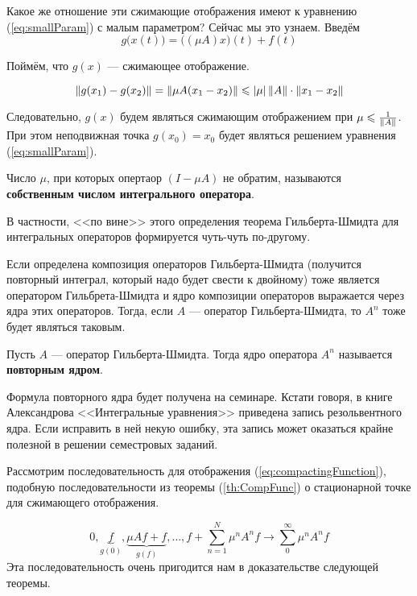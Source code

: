 \documentclass[12pt]{article}
\begin{document}
	Какое же отношение эти сжимающие отображения имеют к уравнению (\ref{eq:smallParam}) с малым параметром? 
	Сейчас мы это узнаем. Введём 
	\begin{equation}
		g\big(x(t)\big) = \big((\mu A)x\big)(t) + f(t) \label{eq:compactingFunction}
	\end{equation}
	
	Поймём, что $g(x)$ --- сжимающее отображение.
	
	$$\left\| g(x_1) - g(x_2) \right\| = \left\| \mu A(x_1 - x_2) \right\| \leqslant \left| \mu \right| \left\| A \right\| \cdot \left\| x_1 - x_2 \right\|$$
	
	Следовательно, $g(x)$ будем являться сжимающим отображением при $\mu \leqslant \frac{1}{\left\| A \right\|}$. При этом
	неподвижная точка $g(x_0) = x_0$ будет являться решением уравнения (\ref{eq:smallParam}).
	
	\begin{defi}
		Число $\mu$, при которых опертаор $(I - \mu A)$ не обратим, называются \textbf{собственным числом
		интегрального оператора}.
	\end{defi}
	
	В частности, <<по вине>> этого определения теорема Гильберта-Шмидта для интегральных операторов формируется
	чуть-чуть по-другому.
	
	Если определена композиция операторов Гильберта-Шмидта (получится повторный интеграл, который надо будет 
	свести к двойному) тоже является оператором Гильбрета-Шмидта и ядро композиции операторов выражается 
	через ядра этих операторов. Тогда, если $A$ --- оператор Гильберта-Шмидта, то $A^n$ тоже будет являться
	таковым.
	
	\begin{defi}
		Пусть $A$ --- оператор Гильберта-Шмидта. Тогда ядро оператора $A^n$ называется \textbf{повторным ядром}.
	\end{defi}
	
	{\footnotesize
	Формула повторного ядра будет получена на семинаре. Кстати говоря, в книге Александрова <<Интегральные уравнения>>
	приведена запись резольвентного ядра. Если исправить в ней некую ошибку, эта запись может оказаться крайне полезной
	в решении семестровых заданий.\par
	}
	
	Рассмотрим последовательность для отображения (\ref{eq:compactingFunction}), подобную последовательности
	из теоремы (\ref{th:CompFunc}) о стационарной точке для сжимающего отображения.
	
	$$0, \underbrace{f}_{g(0)}, \underbrace{\mu Af + f}_{g(f)}, \ldots, f + \sum_{n=1}^N \mu^nA^nf \rightarrow \sum_0^{\infty} \mu^nA^n f$$
	Эта последовательность очень пригодится нам в доказательстве следующей теоремы.	
	
\end{document}
